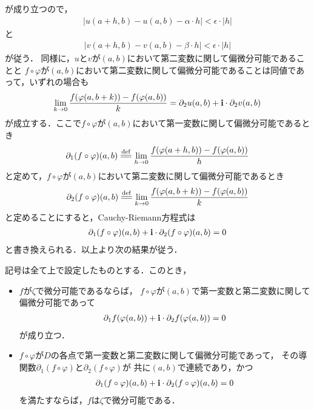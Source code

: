 	が成り立つので，
	\begin{align}
		\left| u(a+h,b) - u(a,b) - \alpha \cdot h\right| < \epsilon \cdot |h|
	\end{align}
	と
	\begin{align}
		\left| v(a+h,b) - v(a,b) - \beta \cdot h\right| < \epsilon \cdot |h|
	\end{align}
	が従う．
	同様に，$u$と$v$が$(a,b)$において第二変数に関して偏微分可能であることと
	$f \circ \varphi$が$(a,b)$において第二変数に関して偏微分可能であることは同値であって，いずれの場合も
	\begin{align}
		\lim_{k \to 0} \frac{f(\varphi(a,b+k)) - f(\varphi(a,b))}{k} = \partial_2 u(a,b) + \mathbf{i} \cdot \partial_2 v(a,b)
	\end{align}
	が成立する．ここで$f \circ \varphi$が$(a,b)$において第一変数に関して偏微分可能であるとき
	\begin{align}
		\partial_1 (f \circ \varphi) (a,b) \defeq \lim_{h \to 0} \frac{f(\varphi(a+h,b)) - f(\varphi(a,b))}{h}
	\end{align}
	と定めて，$f \circ \varphi$が$(a,b)$において第二変数に関して偏微分可能であるとき
	\begin{align}
		\partial_2 (f \circ \varphi) (a,b) \defeq \lim_{k \to 0} \frac{f(\varphi(a,b+k)) - f(\varphi(a,b))}{k}
	\end{align}
	と定めることにすると，Cauchy-Riemann方程式は
	\begin{align}
		\partial_1 (f \circ \varphi) (a,b) + \mathbf{i} \cdot \partial_2 (f \circ \varphi)(a,b) = 0
	\end{align}
	と書き換えられる．以上より次の結果が従う．
	
	\begin{screen}
		\begin{thm}[微分可能性と連続偏微分可能性]
		\label{thm:differentiable_iff_continuously_partially_differentiable}
			記号は全て上で設定したものとする．このとき，
			\begin{itemize}
				\item $f$が$\zeta$で微分可能であるならば，
					$f \circ \varphi$が$(a,b)$で第一変数と第二変数に関して偏微分可能であって
					\begin{align}
						\partial_1 f(\varphi(a,b)) + \mathbf{i} \cdot \partial_2 f(\varphi(a,b)) = 0
					\end{align}
					が成り立つ．
				\item $f \circ \varphi$が$D$の各点で第一変数と第二変数に関して偏微分可能であって，
					その導関数$\partial_1 (f \circ \varphi)$と$\partial_2 (f \circ \varphi)$が
					共に$(a,b)$で連続であり，かつ
					\begin{align}
						\partial_1 (f \circ \varphi) (a,b) + \mathbf{i} \cdot \partial_2 (f \circ \varphi)(a,b) = 0
					\end{align}
					を満たすならば，$f$は$\zeta$で微分可能である．
			\end{itemize}
		\end{thm}
	\end{screen}
	
